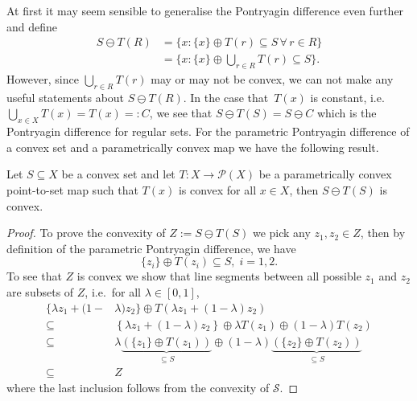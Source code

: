 %
At first it may seem sensible to generalise the Pontryagin difference even further and define
%
\begin{equation}\label{eq:extended:parametric:pontryagin:difference}
\begin{split}
	S\ominus T(R) &= \{x:\{x\}\oplus T(r)\subseteq S\,\forall\, r\in R\}\\
	&=\{x:\{x\}\oplus\bigcup_{r\in R} T(r)\subseteq S\}.
\end{split}
\end{equation}
%
However, since $\bigcup_{r\in R} T(r)$ may or may not be convex, we can not make any useful
statements about $S\ominus T(R)$. 
%
In the case that~$T(x)$ is constant, i.e. $\bigcup_{x\in X}T(x)=T(x)=:C$,
we see that $S\ominus T(S)=S\ominus C$ which is the Pontryagin difference for regular sets.
%
For the parametric Pontryagin difference of a convex set and a parametrically convex map we 
have the following result.
%
\begin{thm}\label{thm:convexity:of:pontryagin:difference}
  Let $S\subseteq X$ be a convex set and let $T:X\rightarrow\mathcal P(X)$ be a parametrically convex point-to-set
  map such that $T(x)$ is convex for all $x\in X$, then $S\ominus T(S)$ is convex.
\end{thm}
%
\begin{proof}
To prove the convexity of $ Z :=  S\ominus T( S)$ we pick any $z_1,z_2\in Z$, then
by definition of the parametric Pontryagin difference, we have
%
\begin{equation}
	\{z_i\} \oplus T(z_i) \subseteq S,\; i=1,2.
\end{equation}
%
To see that $ Z$ is convex we show that line segments between
all possible $z_1$ and $z_2$ are subsets of $ Z$, i.e.~for all $\lambda \in [0,1]$,
\begin{equation}
\begin{aligned}
	\{ \lambda z_1 + (1-&\lambda)z_2
	\}\oplus T\left( \lambda z_1 + (1-\lambda)z_2\right)\\
	\subseteq&\left\{ \lambda z_1 + (1-\lambda)z_2
	\right\}\oplus \lambda T(z_1) \oplus (1-\lambda)
	T(z_2)\\
	\subseteq &\lambda\underbrace{(\{z_1\}\oplus T(z_1))}_{\subseteq S}\oplus
	(1-\lambda)\underbrace{(\{z_2\}\oplus T(z_2))}_{\subseteq S}\\
	\subseteq& Z
\end{aligned}
\end{equation}
%
where the last inclusion follows from the convexity of $\mathcal S$.
\end{proof}
